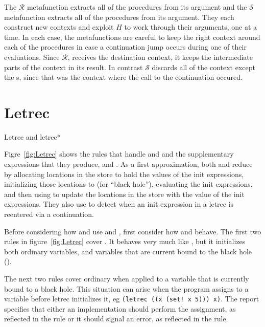 The $\mathscr{R}$ metafunction extracts all of the 
procedures from its argument and the $\mathscr{S}$ metafunction extracts all of the  procedures from its argument. They each construct new contexts and exploit
$H$ to work through their arguments, one  at a time.
In each case, the metafunctions are careful to keep the right
 context around each of the procedures in case a continuation
jump occurs during one of their evaluations. 
Since $\mathscr{R}$,
receives the destination context, it keeps the intermediate
parts of the context in its result.
In contrast
$\mathscr{S}$ discards all of the context except the s,
since that was the context where the call to the
continuation occured.

\section{Letrec}

\beginfig
\begin{center}

\end{center}
\caption{Letrec and letrec*}
\label{fig:Letrec}
\endfig

Figre~\ref{fig:Letrec} shows the rules that handle  and  and the supplementary expressions that they produce,  and . As a first approximation, both  and  reduce by allocating locations in the store to hold the values of the init expressions, initializing those locations to  (for ``black hole''), evaluating the init expressions, and then using  to update the locations in the store with the value of the init expressions. They also use  to detect when an init expression in a letrec is reentered via a continuation.

Before considering how  and  use  and , first consider how  and  behave. The first two rules in figure~\ref{fig:Letrec} cover . It behaves very much like , but it initializes both ordinary variables, and variables that are current bound to the black hole ().

The next two rules cover ordinary  when applied to a variable that is currently bound to a black hole. This situation can arise when the program assigns to a variable before letrec initializes it, eg \verb|(letrec ((x (set! x 5))) x)|. The report specifies that either an implementation should perform the assignment, as reflected in the  rule or it should signal an error, as reflected in the  rule.

